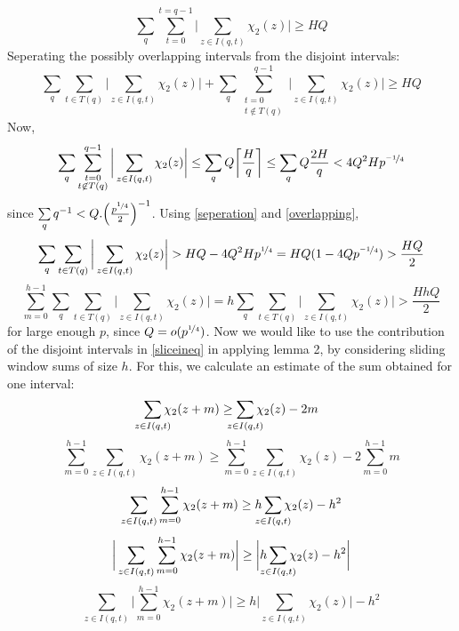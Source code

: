 \documentclass{report}
\begin{document}
$$\sum_q\sum\limits_{t=0}^{t=q-1}\bigg \lvert\sum\limits_{z\in I(q,t)}\chi_2(z)\bigg \rvert \geq HQ$$
Seperating the possibly overlapping intervals from the disjoint intervals:
\begin{equation} \label{seperation}
\sum_q\sum\limits_{t\in T(q)}\bigg \lvert\sum\limits_{z\in I(q,t)}\chi_2(z)\bigg \rvert+\sum_q\sum\limits_{\substack{t=0\\t\not \in T(q)}}^{q-1}\bigg \lvert\sum\limits_{z\in I(q,t)}\chi_2(z)\bigg \rvert \geq HQ
\end{equation}
Now,
\begin{equation} \label{overlapping}
\sum_q\sum\limits_{\substack{t=0\\t\not \in T(q)}}^{q-1}\bigg\lvert\sum\limits_{z\in I(q,t) }\chi_2(z)\bigg \rvert \leq \sum\limits_q Q\bigg\lceil\frac{H}{q}\bigg\rceil \leq \sum\limits_q Q\frac{2H}{q} < 4Q^2 Hp^{\nicefrac{-1}{4}}
\end{equation}
since $\sum\limits_q q^{-1} < Q.\Big(\frac{p^{\nicefrac{1}{4}}}{2}\Big)^{-1}$. Using \ref{seperation} and \ref{overlapping},
$$\sum_q\sum\limits_{t\in T(q)}\bigg \lvert\sum\limits_{z\in I(q,t)}\chi_2(z)\bigg \rvert > HQ - 4Q^2 Hp^{\nicefrac{1}{4}}=HQ(1-4Qp^{\nicefrac{-1}{4}})>\frac{HQ}{2}$$
\begin{equation} \label{sliceineq}
\sum\limits_{m=0}^{h-1}\sum_q\sum\limits_{t\in T(q)}\bigg \lvert\sum\limits_{z\in I(q,t)}\chi_2(z)\bigg \rvert = h \sum_q\sum\limits_{t\in T(q)}\bigg \lvert\sum\limits_{z\in I(q,t)}\chi_2(z)\bigg \rvert > \frac{HhQ}{2}
\end{equation}
for large enough $p$, since $Q=o(p^{\nicefrac{1}{4}})$. Now we would like to use the contribution of the disjoint intervals in \ref{sliceineq} in applying lemma 2, by considering sliding window sums of size $h$. For this, we calculate an estimate of the sum obtained for one interval:
$$\sum\limits_{\mathclap {z\in I(q,t)}}\chi_2(z+m)\geq \sum\limits_{\mathclap{z\in I(q,t)}}\chi_2(z)-2m$$
$$\sum\limits_{m=0}^{h-1}\sum\limits_{z\in I(q,t)}\chi_2(z+m)\geq \sum\limits_{m=0}^{h-1}\sum\limits_{z\in I(q,t)}\chi_2(z)-2 \sum\limits_{m=0}^{h-1}m$$
$$\sum\limits_{z\in I(q,t)}\sum\limits_{m=0}^{h-1}\chi_2(z+m)\geq h\sum\limits_{\mathclap{z\in I(q,t)}}\chi_2(z)-h^2$$
$$\bigg \lvert\sum\limits_{z\in I(q,t)} \sum\limits_{m=0}^{h-1}\chi_2(z+m) \bigg \rvert \geq \bigg \lvert h\sum\limits_{\mathclap{z\in I(q,t)}}\chi_2(z)-h^2 \bigg \rvert$$
$$\sum\limits_{z\in I(q,t)}\bigg \lvert \sum\limits_{m=0}^{h-1}\chi_2(z+m) \bigg \rvert \geq h\bigg \lvert \sum\limits_{z\in I(q,t)}\chi_2(z)\bigg \rvert-h^2 $$
\end{document}

